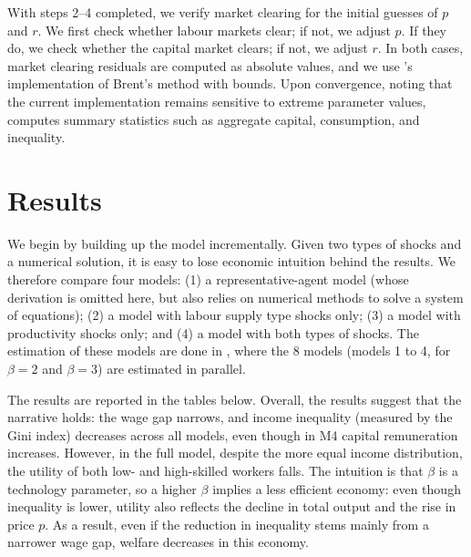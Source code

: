 \documentclass{article}
\begin{document}
With steps 2--4 completed, we verify market clearing for the initial guesses of $p$ and $r$. We first check whether labour markets clear; if not, we adjust $p$. If they do, we check whether the capital market clears; if not, we adjust $r$. In both cases, market clearing residuals are computed as absolute values, and we use 's  implementation of Brent's method with bounds. Upon convergence, noting that the current implementation remains sensitive to extreme parameter values,  computes summary statistics such as aggregate capital, consumption, and inequality.

\vspace{-0.6cm}
\section{Results}
\vspace{-0.3cm}

We begin by building up the model incrementally. Given two types of shocks and a numerical solution, it is easy to lose economic intuition behind the results. We therefore compare four models: (1) a representative-agent model (whose derivation is omitted here, but also relies on numerical methods to solve a system of equations); (2) a model with labour supply type shocks only; (3) a model with productivity shocks only; and (4) a model with both types of shocks. The estimation of these models are done in , where the 8 models (models 1 to 4, for $\beta=2$ and $\beta=3$) are estimated in parallel.

The results are reported in the tables below. Overall, the results suggest that the narrative holds: the wage gap narrows, and income inequality (measured by the Gini index) decreases across all models, even though in M4 capital remuneration increases. However, in the full model, despite the more equal income distribution, the utility of both low- and high-skilled workers falls. The intuition is that $\beta$ is a technology parameter, so a higher $\beta$ implies a less efficient economy: even though inequality is lower, utility also reflects the decline in total output and the rise in price $p$. As a result, even if the reduction in inequality stems mainly from a narrower wage gap, welfare decreases in this economy.

\vspace{0.5cm}
\end{document}
